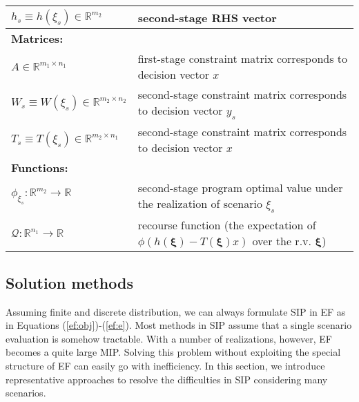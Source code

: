 \begin{table}[H]
{\begin{tabular}{ll}
			$h_s\equiv h(\xi_s)\in\mathbb{R}^{m_2}$	& second-stage RHS vector\\ \midrule
			\multicolumn{2}{l}{\textbf{Matrices:}} \\  
			$A\in\mathbb{R}^{m_1\times n_1}$	& first-stage constraint matrix corresponds to decision vector $x$\\
			$W_s\equiv W(\xi_s)\in\mathbb{R}^{m_2\times n_2}$	& second-stage constraint matrix corresponds to decision vector $y_s$\\
			$T_s\equiv T(\xi_s)\in\mathbb{R}^{m_2\times n_1}$	& second-stage constraint matrix corresponds to decision vector $x$\\ \midrule
			\multicolumn{2}{l}{\textbf{Functions:}} \\
			$\phi_{\xi_s}:\mathbb{R}^{m_2}\to\mathbb{R}$	& second-stage program optimal value under the realization of scenario $\xi_s$	\\
			$\mathcal{Q}:\mathbb{R}^{n_1}\to\mathbb{R}$	& recourse function (the expectation of $\phi\left( h(\pmb{\xi})-T(\pmb{\xi})x \right)$ over the r.v. $\pmb{\xi}$) 	\\
			\bottomrule
		\end{tabular}
	}
\end{table} 

\subsection{Solution methods}
Assuming finite and discrete distribution, we can always formulate SIP in EF as in Equations (\ref{ef:obj})-(\ref{ef:e}).  %
Most methods in SIP assume that a single scenario evaluation is somehow tractable. With a number of realizations, however, EF becomes a quite large MIP. Solving this problem without exploiting the special structure of EF can easily go with inefficiency. In this section, we introduce representative approaches to resolve the difficulties in SIP considering many scenarios.

